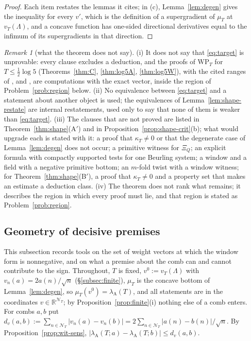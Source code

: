 \documentclass[11pt]{amsart}
\theoremstyle{definition}
\theoremstyle{remark}
\newtheorem{remark}[theorem]{Remark}
\newcommand{\R}{\mathbb R}
\newcommand{\lamA}{\lambda_{\mathrm A}(T)}
\newcommand{\NT}{\mathcal N_T}
\begin{document}
\begin{proof}
Each item restates the lemmas it cites; in (c), Lemma~\ref{lem:degen} gives the inequality for every $v'$, which is the definition of a
supergradient of $\mu_T$ at $v_T(\Lambda)$, and a concave function has one-sided directional derivatives equal to the infimum of its
supergradients in that direction.
\end{proof}

\begin{remark}[what the theorem does not say]\label{rem:shape-scope}
(i) It does not say that \eqref{eq:target} is unprovable: every clause excludes a deduction, and the proofs of $\mathrm{WP}_T$ for
$T\le\frac12\log5$ (Theorems~\ref{thm:C}, \ref{thm:log5A}, \ref{thm:log5W}), with the cited ranges of \cite{Zhu2026}, \cite{Liu2026} and \cite{Mori15},
are computations with the exact vector, inside the region of Problem~\ref{prob:region} below. (ii) No equivalence between
\eqref{eq:target} and a statement about another object is used; the equivalences of Lemma~\ref{lem:shape-restate} are internal
restatements, used only to say that none of them is weaker than \eqref{eq:target}. (iii) The clauses that are not proved are listed in
Theorem~\ref{thm:shape}(A$'$) and in Proposition~\ref{prop:shape-crit}(b); what would upgrade each is stated with it: a proof that
$\kappa_T\ne0$ or that the degenerate case of Lemma~\ref{lem:degen} does not occur; a primitive witness for $\Xi_Q$; an explicit formula
with compactly supported tests for one Beurling system; a window and a field with a negative primitive bottom; an $m$-fold twist with
a window witness; for Theorem~\ref{thm:shape}(B$'$), a proof that $\kappa_T\ne0$ and a property set that makes an estimate a deduction class. (iv) The theorem does not rank what remains; it describes the region in which every proof must lie, and that region
is stated as Problem~\ref{prob:region}.
\end{remark}


\subsection{Geometry of decisive premises}\label{subsec:shape-geom}

This subsection records tools on the set of weight vectors at which the window form is nonnegative, and on what a
premise about the comb can and cannot contribute to the sign. Throughout, $T$ is fixed, $v^0:=v_T(\Lambda)$ with
$v_n(a)=2a(n)/\sqrt n$ (\S\ref{subsec:finite}), $\mu_T$ is the concave bottom of Lemma~\ref{lem:degen}, so $\mu_T(v^0)=\lamA$,
and all statements are in the coordinates $v\in\R^{\NT}$; by Proposition~\ref{prop:finite}(i) nothing else of a comb enters.
For combs $a,b$ put $d_v(a,b):=\sum_{n\in\NT}|v_n(a)-v_n(b)|=2\sum_{n\in\NT}|a(n)-b(n)|/\sqrt n$. By Proposition~\ref{prop:wit-sens},
$|\lambda_{\mathrm A}(T;a)-\lambda_{\mathrm A}(T;b)|\le d_v(a,b)$.
\end{document}
